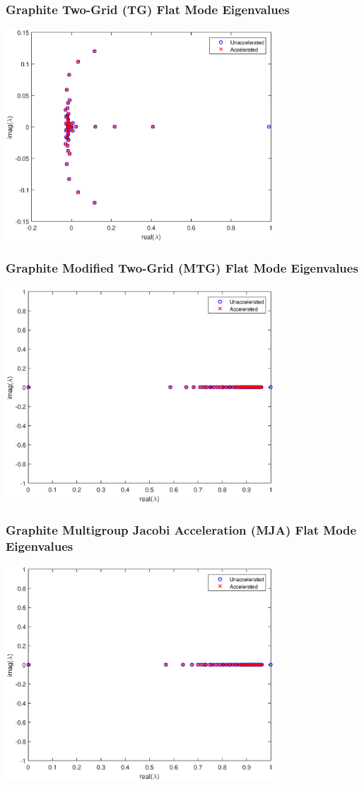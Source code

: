\documentclass[compress,10pt]{beamer}
\begin{document}
\begin{frame}[t]
{
\frametitle{\small Graphite Two-Grid (TG) Flat Mode Eigenvalues}
\hspace*{1.1cm}
\includegraphics[width=0.75\textwidth]{images/IM1_Graph_FA_TG.eps}
}
{
\frametitle{\small Graphite Modified Two-Grid (MTG) Flat Mode Eigenvalues}
\hspace*{1.1cm}
\includegraphics[width=0.75\textwidth]{images/IM1_Graph_FA_MTG.eps}
}
{
\frametitle{\small Graphite Multigroup Jacobi Acceleration (MJA) Flat Mode Eigenvalues}
\hspace*{1.1cm}
\includegraphics[width=0.75\textwidth]{images/IM1_Graph_FA_MJA.eps}
}
\end{frame}
\end{document}

